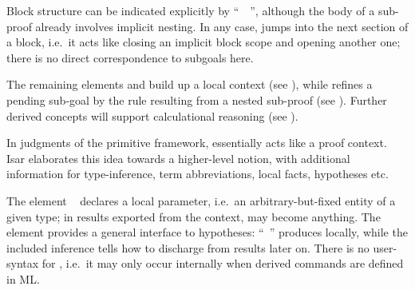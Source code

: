 \begin{isabellebody}
\begin{isamarkuptext}
  \medskip Block structure can be indicated explicitly by ``\hyperlink{command.braceleft}{\mbox{\isa{\isacommand{{\isacharbraceleft}}}}}~\isa{{\isachardoublequote}{\isasymdots}{\isachardoublequote}}~\hyperlink{command.braceright}{\mbox{\isa{\isacommand{{\isacharbraceright}}}}}'', although the body of a sub-proof
  already involves implicit nesting.  In any case, \hyperlink{command.next}{\mbox{}}
  jumps into the next section of a block, i.e.\ it acts like closing
  an implicit block scope and opening another one; there is no direct
  correspondence to subgoals here.

  The remaining elements \hyperlink{command.fix}{\mbox{}} and \hyperlink{command.assume}{\mbox{}} build up
  a local context (see ), while
  \hyperlink{command.show}{\mbox{}} refines a pending sub-goal by the rule resulting
  from a nested sub-proof (see ).
  Further derived concepts will support calculational reasoning (see
  ).%
\end{isamarkuptext}%
\isamarkuptrue%
%
\isamarkuptrue%
%
\begin{isamarkuptext}%
In judgments \isa{{\isachardoublequote}{\isasymGamma}\ {\isasymturnstile}\ {\isasymphi}{\isachardoublequote}} of the primitive framework, \isa{{\isachardoublequote}{\isasymGamma}{\isachardoublequote}}
  essentially acts like a proof context.  Isar elaborates this idea
  towards a higher-level notion, with additional information for
  type-inference, term abbreviations, local facts, hypotheses etc.

  The element \hyperlink{command.fix}{\mbox{}}~ declares a local
  parameter, i.e.\ an arbitrary-but-fixed entity of a given type; in
  results exported from the context,  may become anything.
  The \hyperlink{command.assume}{\mbox{}}~ element provides a
  general interface to hypotheses: ``\hyperlink{command.assume}{\mbox{}}~'' produces  locally, while the
  included inference tells how to discharge  from results
   later on.  There is no user-syntax for , i.e.\ it may only occur internally when derived
  commands are defined in ML.


\end{isamarkuptext}
\end{isabellebody}
